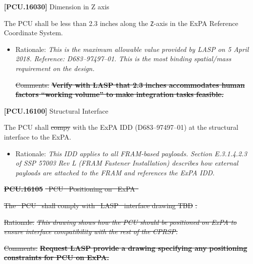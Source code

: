 \documentclass[12pt,oneside,oldfontcommands]{memoir}
\providecommand{\DIFaddtex}[1]{{\protect\color{blue}\uwave{#1}}} %
\providecommand{\DIFdeltex}[1]{{\protect\color{red}\sout{#1}}}                      %
\providecommand{\DIFaddbegin}{} %
\providecommand{\DIFaddend}{} %
\providecommand{\DIFdelbegin}{} %
\providecommand{\DIFdelend}{} %
\providecommand{\DIFadd}[1]{\texorpdfstring{\DIFaddtex{#1}}{#1}} %
\providecommand{\DIFdel}[1]{\texorpdfstring{\DIFdeltex{#1}}{}} %
\newcommand{\DIFscaledelfig}{0.5}
\newlength{\DIFdelgraphicswidth} %
\newlength{\DIFdelgraphicsheight} %
\newcommand{\DIFaddincludegraphics}[2][]{{\color{blue}\fbox{\DIFOincludegraphics[#1]{#2}}}} %
\newcommand{\DIFdelincludegraphics}[2][]{%
\sbox{\DIFdelgraphicsbox}{\DIFOincludegraphics[#1]{#2}}%
\settoboxwidth{\DIFdelgraphicswidth}{\DIFdelgraphicsbox} %
\settoboxtotalheight{\DIFdelgraphicsheight}{\DIFdelgraphicsbox} %
\scalebox{\DIFscaledelfig}{%
\parbox[b]{\DIFdelgraphicswidth}{\usebox{\DIFdelgraphicsbox}\\[-\baselineskip] \rule{\DIFdelgraphicswidth}{0em}}\llap{\resizebox{\DIFdelgraphicswidth}{\DIFdelgraphicsheight}{%
\setlength{\unitlength}{\DIFdelgraphicswidth}%
\begin{picture}(1,1)%
\thicklines\linethickness{2pt} %
{\color[rgb]{1,0,0}\put(0,0){\framebox(1,1){}}}%
{\color[rgb]{1,0,0}\put(0,0){\line( 1,1){1}}}%
{\color[rgb]{1,0,0}\put(0,1){\line(1,-1){1}}}%
\end{picture}%
}\hspace*{3pt}}} %
} %
\DeclareRobustCommand{\DIFaddbegin}{\DIFOaddbegin \let\includegraphics\DIFaddincludegraphics} %
\DeclareRobustCommand{\DIFaddend}{\DIFOaddend \let\includegraphics\DIFOincludegraphics} %
\DeclareRobustCommand{\DIFdelbegin}{\DIFOdelbegin \let\includegraphics\DIFdelincludegraphics} %
\DeclareRobustCommand{\DIFdelend}{\DIFOaddend \let\includegraphics\DIFOincludegraphics} %
\begin{document}
\textbf{[PCU.16030]} Dimension in Z axis

The \gls{PCU} shall be less than 2.3 inches along the \texttt{Z}-axis in the \gls{ExPA} Reference Coordinate System.

\begin{itemize}
\item{} Rationale: \emph{This is the maximum allowable value provided by LASP on 5 April 2018. Reference: D683--97497--01. This is the most binding spatial\slash mass requirement on the design.}

\DIFdelbegin %
\DIFdel{Comments: }\textbf{\DIFdel{Verify with LASP that 2.3 inches accommodates human factors ``working volume'' to make integration tasks feasible.}}

\DIFdelend \end{itemize}

\textbf{[PCU.16100]} Structural Interface

The \gls{PCU} shall \DIFdelbegin \DIFdel{compy }\DIFdelend \DIFaddbegin \DIFadd{comply }\DIFaddend with the \gls{ExPA} \gls{IDD} (D683--97497--01) at the structural interface to the \gls{ExPA}.

\begin{itemize}
\item{} Rationale: \emph{This IDD applies to all FRAM-based payloads. Section E.3.1.4.2.3 of SSP 57003 Rev L (FRAM Fastener Installation) describes how external payloads are attached to the FRAM and references the ExPA IDD.}

\end{itemize}

\DIFdelbegin \textbf{%
\DIFdel{PCU.16105}%
} %
\DIFdel{\mbox{%
\gls{PCU} }\hspace{0pt}%
Positioning on \mbox{%
\gls{ExPA}
}\hspace{0pt}%
}%

\DIFdel{The \mbox{%
\gls{PCU} }\hspace{0pt}%
shall comply with \mbox{%
\gls{LASP} }\hspace{0pt}%
interface drawing TBD}%
\DIFdel{.
}%

\begin{itemize}%
\DIFdel{Rationale: }\emph{\DIFdel{This drawing shows how the PCU should be positioned on ExPA to ensure interface compatibility with the rest of the CPRSP.}}

\DIFdel{Comments: }\textbf{\DIFdel{Request LASP provide a drawing specifying any positioning constraints for PCU on ExPA.}}


\end{itemize}%
\end{document}
